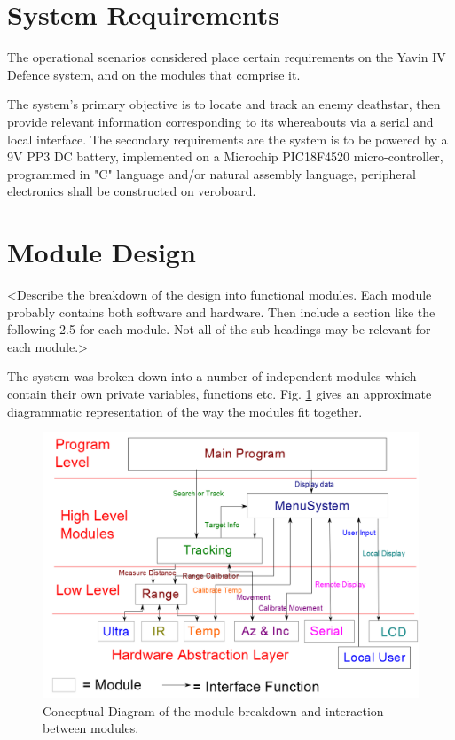 \documentclass[]{report}
\begin{document}
\section{System Requirements}
The operational scenarios considered place certain requirements on the Yavin IV Defence system, and on the modules that comprise it.

The system's primary objective is to locate and track an enemy deathstar, then provide relevant information corresponding to its whereabouts via a serial and local interface. The secondary requirements are the system is to be powered by a 9V PP3 DC battery, implemented on a Microchip PIC18F4520 micro-controller, programmed in "C" language and/or natural assembly language, peripheral electronics shall be constructed on veroboard.

\section{Module Design}
<Describe the breakdown of the design into functional modules. Each module probably contains both software and hardware.
Then include a section like the following 2.5 for each module. Not all of the sub-headings may be relevant for each module.>

The system was broken down into a number of independent modules which contain their own private variables, functions etc. Fig. \ref{fig:Modules} gives an approximate diagrammatic representation of the way the modules fit together.

\begin{figure}
\centering
\includegraphics[width=0.7\linewidth]{../Diagrams/Modules}
\caption[Modules]{Conceptual Diagram of the module breakdown and interaction between modules.}
\label{fig:Modules}
\end{figure}
\end{document}
